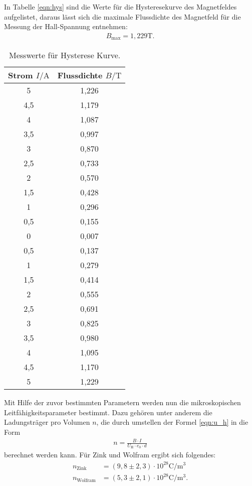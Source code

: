 In Tabelle \ref{eqn:hys} sind die Werte für die Hysteresekurve des Magnetfeldes aufgelistet, daraus lässt sich die maximale Flussdichte des Magnetfeld
für die Messung der Hall-Spannung entnehmen:
\begin{align*}
 B_\mathrm{max}=1,229\si{\tesla}.
\end{align*}
\begin{table}
  \centering
  \caption{Messwerte für Hysterese Kurve.}
  \label{tab:hys}
  \begin{tabular}{c c}
    \toprule
    Strom $I/\si{\ampere}$ & Flussdichte $B/\si{\tesla}$\\
    \midrule
    5     &  1,226 \\
    4,5   &  1,179 \\
    4     &  1,087 \\
    3,5   &  0,997 \\
    3     &  0,870 \\
    2,5   &  0,733 \\
    2     &  0,570 \\
    1,5   &  0,428 \\
    1     &  0,296 \\
    0,5   &  0,155 \\
    0     &  0,007 \\
    0,5   &  0,137 \\
    1     &  0,279 \\
    1,5   &  0,414 \\
    2     &  0,555 \\
    2,5   &  0,691 \\
    3     &  0,825 \\
    3,5   &  0,980 \\
    4     &  1,095 \\
    4,5   &  1,170 \\
    5     &  1,229 \\
    \bottomrule
  \end{tabular}
\end{table}

Mit Hilfe der zuvor bestimmten Parametern werden nun die mikroskopischen Leitfähigkeitsparameter
bestimmt.
Dazu gehören unter anderem die Ladungsträger pro Volumen $n$, die durch umstellen der Formel \eqref{eqn:u_h} in die Form
\begin{align}
  n=\frac{B \cdot I}{U_\mathrm{H}\cdot e_0 \cdot d}
\end{align}
berechnet werden kann.
Für Zink und Wolfram ergibt sich folgendes:
\begin{align*}
n_\mathrm{Zink}&=(9,8\pm2,3)\cdot10^{28}\si{\coulomb\per\meter\tothe{3}}\\
n_\mathrm{Wolfram}&=(5,3\pm2,1)\cdot10^{28}\si{\coulomb\per\meter\tothe{3}}.
\end{align*}

